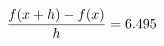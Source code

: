 \documentclass[preview]{standalone}
\begin{document}
\begin{align*}
\special{dvisvgm:raw <g id='unique000'>}\frac{f(x+h)-f(x)}{h} = 6.495\special{dvisvgm:raw </g>}
\end{align*}
\end{document}
